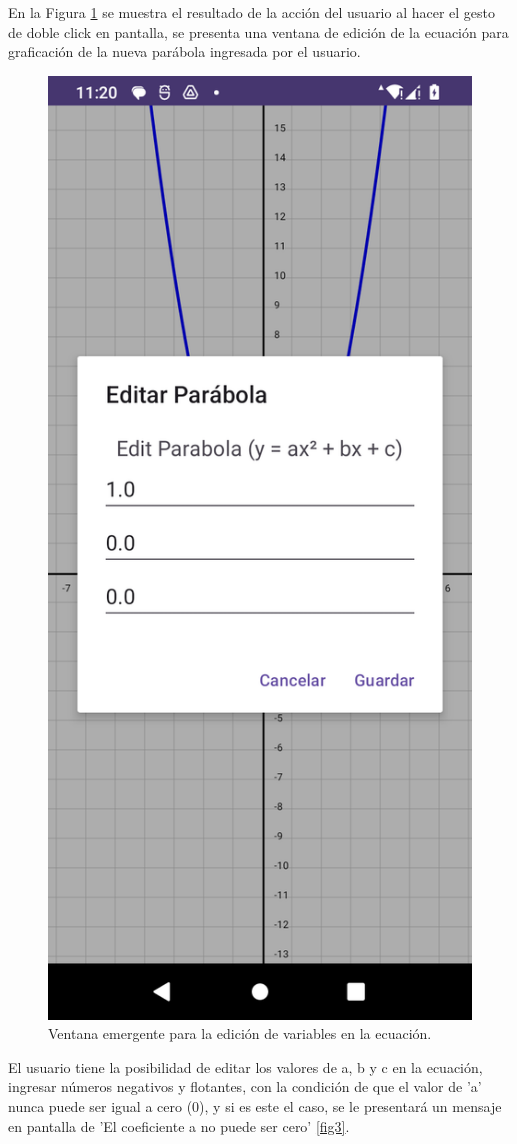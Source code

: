\documentclass[conference]{IEEEtran}
\begin{document}
En la Figura \ref{fig2} se muestra el resultado de la acción del usuario al hacer el gesto de doble click en pantalla, se presenta una ventana de edición de la ecuación para graficación de la nueva parábola ingresada por el usuario.
\begin{figure}[H]
    \centering
    \includegraphics[width=0.4\columnwidth]{editar_parabola.png}
    \caption{Ventana emergente para la edición de variables en la ecuación.}
    \label{fig2}
\end{figure}



El usuario tiene la posibilidad de editar los valores de a, b y c en la ecuación, ingresar números negativos y flotantes, con la condición de que el valor de 'a' nunca puede ser igual a cero (0), y si es este el caso, se le presentará un mensaje en pantalla de 'El coeficiente a no puede ser cero'  \ref{fig3}.
\end{document}
